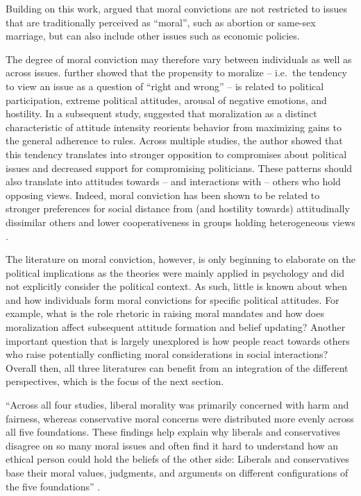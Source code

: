 \documentclass[11pt,]{article}
\begin{document}
Building on this work, \citet{ryan2014reconsidering} argued that moral
convictions are not restricted to issues that are traditionally
perceived as ``moral'', such as abortion or same-sex marriage, but can
also include other issues such as economic policies.

The degree of moral conviction may therefore vary between individuals as
well as across issues. \citet{ryan2014reconsidering} further showed that
the propensity to moralize -- i.e.~the tendency to view an issue as a
question of ``right and wrong'' -- is related to political
participation, extreme political attitudes, arousal of negative
emotions, and hostility. In a subsequent study, \citet{ryan2016no}
suggested that moralization as a distinct characteristic of attitude
intensity reorients behavior from maximizing gains to the general
adherence to rules. Across multiple studies, the author showed that this
tendency translates into stronger opposition to compromises about
political issues and decreased support for compromising politicians.
These patterns should also translate into attitudes towards -- and
interactions with -- others who hold opposing views. Indeed, moral
conviction has been shown to be related to stronger preferences for
social distance from (and hostility towards) attitudinally dissimilar
others and lower cooperativeness in groups holding heterogeneous views
\citep{skitka2005moral}.

The literature on moral conviction, however, is only beginning to
elaborate on the political implications as the theories were mainly
applied in psychology and did not explicitly consider the political
context. As such, little is known about when and how individuals form
moral convictions for specific political attitudes. For example, what is
the role rhetoric in raising moral mandates and how does moralization
affect subsequent attitude formation and belief updating? Another
important question that is largely unexplored is how people react
towards others who raise potentially conflicting moral considerations in
social interactions? Overall then, all three literatures can benefit
from an integration of the different perspectives, which is the focus of
the next section.

``Across all four studies, liberal morality was primarily concerned with
harm and fairness, whereas conservative moral concerns were distributed
more evenly across all five foundations. These findings help explain why
liberals and conservatives disagree on so many moral issues and often
find it hard to understand how an ethical person could hold the beliefs
of the other side: Liberals and conservatives base their moral values,
judgments, and arguments on different configurations of the five
foundations'' \citep[1040]{graham2009liberals}.
\end{document}
